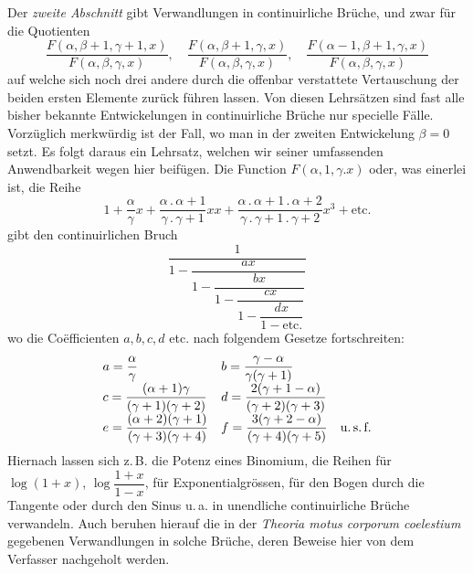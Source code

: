 Der \textit{zweite Abschnitt} gibt Verwandlungen in continuirliche Brüche, und zwar für die Quotienten
\[
\frac{F(\alpha,\beta+1,\gamma+1,x)}{F(\alpha,\beta,\gamma,x)},\quad
\frac{F(\alpha,\beta+1,\gamma,x)}{F(\alpha,\beta,\gamma,x)},\quad
\frac{F(\alpha-1,\beta+1,\gamma,x)}{F(\alpha,\beta,\gamma,x)}
\]
auf welche sich noch drei andere durch die offenbar verstattete Vertauschung der beiden ersten Elemente zurück führen lassen. Von diesen Lehrsätzen sind fast alle bisher bekannte Entwickelungen in continuirliche Brüche nur specielle Fälle.
Vorzüglich merkwürdig ist der Fall, wo man in der zweiten Entwickelung $\beta=0$ setzt. Es folgt daraus ein Lehrsatz, welchen wir seiner umfassenden Anwendbarkeit wegen hier beifügen. Die Function $F(\alpha,1,\gamma.x)$ oder, was einerlei ist, die Reihe
\[
1+\frac{\alpha}{\gamma}x
+\frac{\alpha\,.\,\alpha+1}{\gamma\,.\,\gamma+1}xx
+\frac{\alpha\,.\,\alpha+1\,.\,\alpha+2}{\gamma\,.\,\gamma+1\,.\,\gamma+2}x^3+\mathrm{etc.}
\]
gibt den continuirlichen Bruch
\[
\dfrac{1}{\displaystyle 1-\dfrac{ax}{\displaystyle 1-\dfrac{bx}{\displaystyle 1-\dfrac{cx}{\displaystyle 1-\dfrac{dx}{1-\mathrm{etc.}}}}}}
\]
wo die Coëfficienten $a,b,c,d$ etc. nach folgendem Gesetze fortschreiten:
\[
\begin{array}{ll}
a=\dfrac{\alpha}{\gamma}&b=\dfrac{\gamma-\alpha}{\gamma(\gamma+1)}\\[6pt]
c=\dfrac{(\alpha+1)\gamma}{(\gamma+1)(\gamma+2)}&d=\dfrac{2(\gamma+1-\alpha)}{(\gamma+2)(\gamma+3)}\\[6pt]
e=\dfrac{(\alpha+2)(\gamma+1)}{(\gamma+3)(\gamma+4)}&f=\dfrac{3(\gamma+2-\alpha)}{(\gamma+4)(\gamma+5)}\quad\mbox{u.\,s.\,f.}
\end{array}
\]
Hiernach lassen sich z.\,B. die Potenz eines Binomium, die Reihen für $\log(1+x)$, $\log\dfrac{1+x}{1-x}$, für Exponentialgrössen, für den Bogen durch die Tangente oder durch den Sinus u.\,a. in unendliche continuirliche Brüche verwandeln. Auch beruhen hierauf die in der \textit{Theoria motus corporum coelestium} gegebenen Verwandlungen in solche Brüche, deren Beweise hier von dem Verfasser nachgeholt werden.

